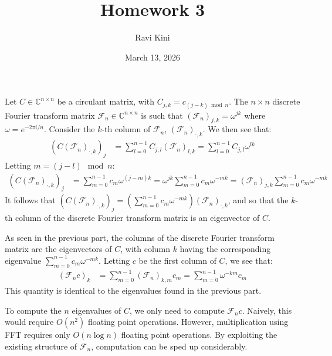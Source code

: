 \documentclass{article}
\title{Homework 3}
\author{Ravi Kini}
\date{March 13, 2026}
\begin{document}
\maketitle

\problem{}
Let $C \in \mathbb{C}^{n\times n}$ be a circulant matrix, with $C_{j,k} = c_{(j - k) \bmod n}$. The $n \times n$ discrete Fourier transform matrix $\mathcal{F}_n \in \mathbb{C}^{n\times n}$ is such that $(\mathcal{F}_n)_{j,k} = \omega^{jk}$ where $\omega = e^{-2\pi i/n}$. Consider the $k$-th column of $\mathcal{F}_n$, $(\mathcal{F}_n)_{\cdot,k}$. We then see that:
\begin{align*}
    \left(C(\mathcal{F}_n)_{\cdot,k}\right)_j & = \sum_{l=0}^{n-1} C_{j,l}(\mathcal{F}_n)_{l,k} = \sum_{l=0}^{n-1} C_{j,l}\omega^{lk}
\end{align*}
Letting $m = (j - l) \mod n$:
\begin{align*}
    \left(C(\mathcal{F}_n)_{\cdot,k}\right)_j & = \sum_{m=0}^{n-1} c_m\omega^{(j - m)k} = \omega^{jk}\sum_{m=0}^{n-1} c_m\omega^{-mk} = (\mathcal{F}_n)_{j,k}\sum_{m=0}^{n-1} c_m\omega^{-mk}
\end{align*}
It follows that $\left(C(\mathcal{F}_n)_{\cdot,k}\right)_j = \left(\sum_{m=0}^{n-1} c_m\omega^{-mk}\right)(\mathcal{F}_n)_{\cdot,k}$, and so that the $k$-th column of the discrete Fourier transform matrix is an eigenvector of $C$.

As seen in the previous part, the columns of the discrete Fourier transform matrix are the eigenvectors of $C$, with column $k$ having the corresponding eigenvalue $\sum_{m=0}^{n-1} c_m\omega^{-mk}$. Letting $c$ be the first column of $C$, we see that:
\begin{align*}
    (\mathcal{F}_n c)_k & = \sum_{m=0}^{n-1} (\mathcal{F}_n)_{k,m}c_m = \sum_{m=0}^{n-1} \omega^{-km}c_m
\end{align*}
This quantity is identical to the eigenvalues found in the previous part.

To compute the $n$ eigenvalues of $C$, we only need to compute $\mathcal{F}_n c$. Naively, this would require $O(n^2)$ floating point operations. However, multiplication using FFT requires only $O(n \log n)$ floating point operations. By exploiting the existing structure of $\mathcal{F}_n$, computation can be sped up considerably.
\end{document}
